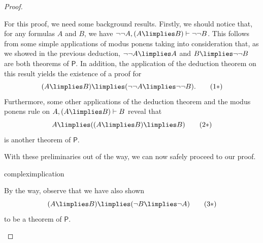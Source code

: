 \begin{proof}
\begin{parlist}
\item For this proof, we need some background results.
Firstly, we should notice that, for any formulas $A$ and $B$, we have $\lnot\lnot A, (A\limplies B) \vdash \lnot\lnot B$.
This follows from some simple applications of modus ponens taking into consideration that, as we showed in the previous deduction, $\lnot\lnot A \limplies A$ and $B \limplies \lnot\lnot B$ are both theorems of $\mathsf{P}$.
In addition, the application of the deduction theorem on this result yields the existence of a proof for
\begin{equation}
(A\limplies B) \limplies (\lnot\lnot A \limplies \lnot\lnot B).
\tag{$1*$}
\label{prelp31}
\end{equation}
Furthermore, some other applications of the deduction theorem and the modus ponens rule on $A,(A\limplies B) \vdash B$ reveal that
\begin{equation}
A \limplies ( (A \limplies B) \limplies B)
\tag{$2*$}
\label{prelp32}
\end{equation}
is another theorem of $\mathsf{P}$.

With these preliminaries out of the way, we can now safely proceed to our proof.
\begin{deduction}{compleximplication}
\end{deduction}
By the way, observe that we have also shown
\begin{equation}
(A \limplies B) \limplies (\lnot B \limplies \lnot A)
\tag{$3*$}
\label{axp3vv}
\end{equation}
to be a theorem of $\mathsf{P}$.


\end{parlist}
\end{proof}
